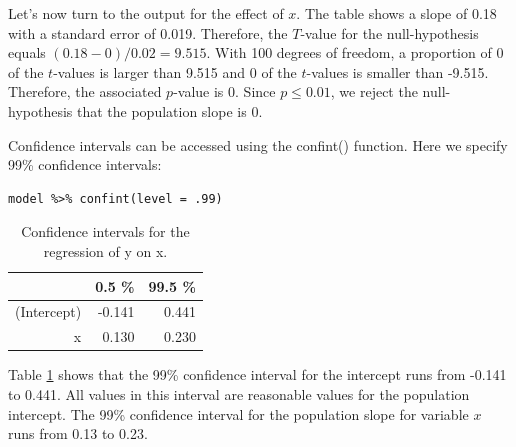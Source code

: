 \documentclass[]{book}\usepackage[]{graphicx}\usepackage[]{color}
\begin{document}
Let's now turn to the output for the effect of $x$. The table shows a slope of 0.18 with a standard error of 0.019. Therefore, the $T$-value for the null-hypothesis equals $(0.18-0)/0.02=9.515$. With 100 degrees of freedom, a proportion of 0 of the $t$-values is larger than 9.515 and 0 of the $t$-values is smaller than -9.515. Therefore, the associated $p$-value is 0. Since $p \leq 0.01$, we reject the null-hypothesis that the population slope is 0. 

Confidence intervals can be accessed using the confint() function. Here we specify 99\% confidence intervals:

\begin{lstlisting}
model %>% confint(level = .99)
\end{lstlisting}


\begin{table}[ht]
\centering
\caption{Confidence intervals for the regression of y on x.} 
\label{tab:conf_xy_r}
\begin{tabular}{rrr}
  \hline
 & 0.5 \% & 99.5 \% \\ 
  \hline
(Intercept) & -0.141 & 0.441 \\ 
  x & 0.130 & 0.230 \\ 
   \hline
\end{tabular}
\end{table}



Table \ref{tab:conf_xy_r} shows that the 99\% confidence interval for the intercept runs from -0.141 to 0.441. All values in this interval are reasonable values for the population intercept. The 99\% confidence interval for the population slope for variable $x$ runs from 0.13 to 0.23.
\end{document}
